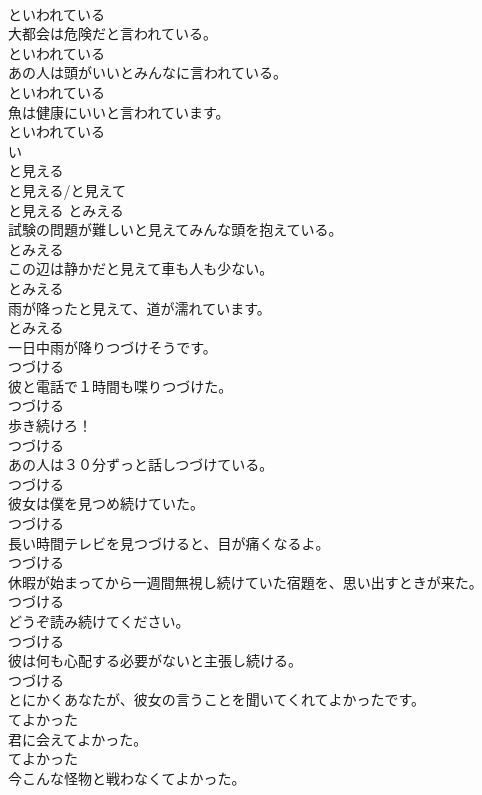\documentclass[8pt]{extreport}
\begin{document}
\begin{CJK}{UTF8}{min}
\\	といわれている	
\\	大都会は危険だと言われている。	
\\	といわれている	
\\	あの人は頭がいいとみんなに言われている。	
\\	といわれている	
\\	魚は健康にいいと言われています。	
\\	といわれている	
\\	い
\\	と見える	
\\	と見える/と見えて	
\\	と見える	とみえる	
\\	試験の問題が難しいと見えてみんな頭を抱えている。	
\\	とみえる	
\\	この辺は静かだと見えて車も人も少ない。	
\\	とみえる	
\\	雨が降ったと見えて、道が濡れています。	
\\	とみえる	
\\	一日中雨が降りつづけそうです。	
\\	つづける	
\\	彼と電話で１時間も喋りつづけた。	
\\	つづける	
\\	歩き続けろ！	
\\	つづける	
\\	あの人は３０分ずっと話しつづけている。	
\\	つづける	
\\	彼女は僕を見つめ続けていた。	
\\	つづける	
\\	長い時間テレビを見つづけると、目が痛くなるよ。	
\\	つづける	
\\	休暇が始まってから一週間無視し続けていた宿題を、思い出すときが来た。	
\\	つづける	
\\	どうぞ読み続けてください。	
\\	つづける	
\\	彼は何も心配する必要がないと主張し続ける。	
\\	つづける	
\\	とにかくあなたが、彼女の言うことを聞いてくれてよかったです。	
\\	てよかった	
\\	君に会えてよかった。	
\\	てよかった	
\\	今こんな怪物と戦わなくてよかった。	

\end{CJK}
\end{document}
